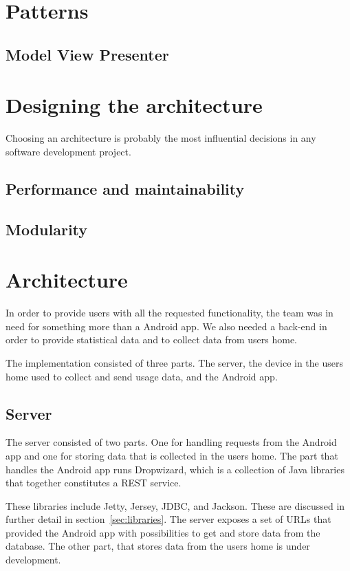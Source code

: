 \section{Patterns}
\subsection{Model View Presenter}

\section{Designing the architecture}
Choosing an architecture is probably the most influential decisions in any software development project. 
\subsection{Performance and maintainability}
\subsection{Modularity}

\section{Architecture}
In order to provide users with all the requested functionality, the team was in need for something more than a Android app. We also needed a back-end in order to provide statistical data and to collect data from users home.

The implementation consisted of three parts. The server, the device in the users home used to collect and send usage data, and the Android app.

\subsection{Server}
The server consisted of two parts. One for handling requests from the Android app and one for storing data that is collected in the users home. 
The part that handles the Android app runs Dropwizard, which is a collection of Java libraries that together constitutes a REST service. 

These libraries include Jetty, Jersey, JDBC, and Jackson. These are discussed in further detail in section~\ref{sec:libraries}.
The server exposes a set of URLs that provided the Android app with 
possibilities to get and store data from the database. The other part, that stores data from the users home is under development.

